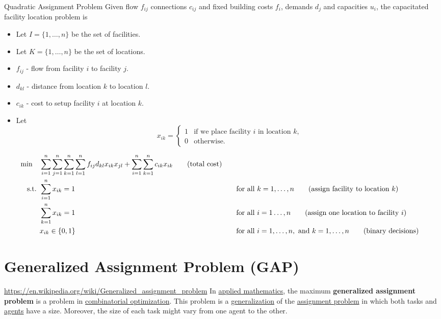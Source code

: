 \begin{general}{Quadratic Assignment Problem}{\npcomplete}
Given flow $f_{ij}$  connections $c_{ij}$ and fixed building costs $f_i$, demands $d_j$ and capacities $u_i$, the capacitated facility location problem is 

\begin{itemize}
\item Let $I = \{1,\dots, n\}$ be the set of facilities.
\item Let $K = \{1, \dots, n\}$ be the set of locations.
\end{itemize}

\begin{itemize}
\item $f_{ij}$ - flow from facility $i$ to facility $j$.
\item $d_{kl}$ - distance from location $k$ to location $l$.
\item $c_{ik}$ - cost to setup facility $i$ at location $k$.
\end{itemize}

\begin{itemize}
\item Let 
\begin{equation*}
x_{ik} = \begin{cases}
1 & \text{if we place facility $i$ in location $k$,}\\
0 & \text{otherwise.}
\end{cases}
\end{equation*}
\end{itemize}

\begin{align}
\min \quad & \displaystyle\sum_{i=1}^n\sum_{j=1}^n \sum_{k=1}^n \sum_{l = 1}^n f_{ij}d_{kl}x_{ik}x_{jl} + \sum_{i=1}^n \sum_{k = 1}^n c_{ik} x_{ik}   \tag{total cost} \\
\text{ s.t. }        & \displaystyle\sum_{i=1}^n x_{ik}=1 &&\quad \text{for all } k=1,\dots,n   \tag{assign facility to location $k$} \\
& \displaystyle \sum_{k=1}^n x_{ik}=1 &&\quad \text{for all } i=1\dots,n   \tag{assign one location to facility $i$} \\
& x_{ik}\in\{0,1\} &&\quad \text{for all } i=1,\dots,n, \text{ and } k = 1, \dots, n   \tag{binary decisions}
\end{align}
\end{general}

\section{Generalized Assignment Problem (GAP)}
\url{https://en.wikipedia.org/wiki/Generalized_assignment_problem}
In \href{applied_mathematics}{applied mathematics}, the maximum
\textbf{generalized assignment problem} is a problem in
\href{combinatorial_optimization}{combinatorial optimization}. This
problem is a \url{generalization} of the
\href{assignment_problem}{assignment problem} in which both tasks and
\href{Agent-based_model}{agents} have a size. Moreover, the size of each
task might vary from one agent to the other.

